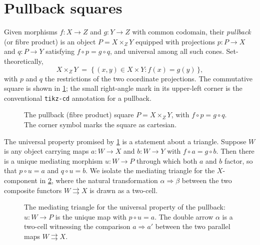 \documentclass[11pt]{article}
\begin{document}
\section{Pullback squares}

Given morphisms $f\colon X \to Z$ and $g\colon Y \to Z$ with common codomain,
their \emph{pullback} (or fibre product) is an object $P = X \times_Z Y$ equipped
with projections $p\colon P \to X$ and $q\colon P \to Y$ satisfying
$f \circ p = g \circ q$, and universal among all such cones. Set-theoretically,
\[
  X \times_Z Y \;=\; \bigl\{\, (x,y) \in X \times Y : f(x) = g(y) \,\bigr\},
\]
with $p$ and $q$ the restrictions of the two coordinate projections. The
commutative square is shown in \cref{fig:pullback}; the small right-angle mark in
its upper-left corner is the conventional \texttt{tikz-cd} annotation for a
pullback.

\begin{figure}[ht]
  \centering
  \caption{The pullback (fibre product) square $P = X \times_Z Y$, with
  $f \circ p = g \circ q$. The corner symbol marks the square as cartesian.}
  \label{fig:pullback}
\end{figure}

The universal property promised by \cref{fig:pullback} is a statement about a
triangle. Suppose $W$ is any object carrying maps $a\colon W \to X$ and
$b\colon W \to Y$ with $f \circ a = g \circ b$. Then there is a unique mediating
morphism $u\colon W \to P$ through which both $a$ and $b$ factor, so that
$p \circ u = a$ and $q \circ u = b$. We isolate the mediating triangle for the
$X$-component in \cref{fig:universal}, where the natural transformation
$\alpha \Rightarrow \beta$ between the two composite functors
$W \rightrightarrows X$ is drawn as a two-cell.

\begin{figure}[ht]
  \centering
  \caption{The mediating triangle for the universal property of the pullback:
  $u\colon W \to P$ is the unique map with $p \circ u = a$. The double arrow
  $\alpha$ is a two-cell witnessing the comparison $a \Rightarrow a'$ between the
  two parallel maps $W \rightrightarrows X$.}
  \label{fig:universal}
\end{figure}
\end{document}

